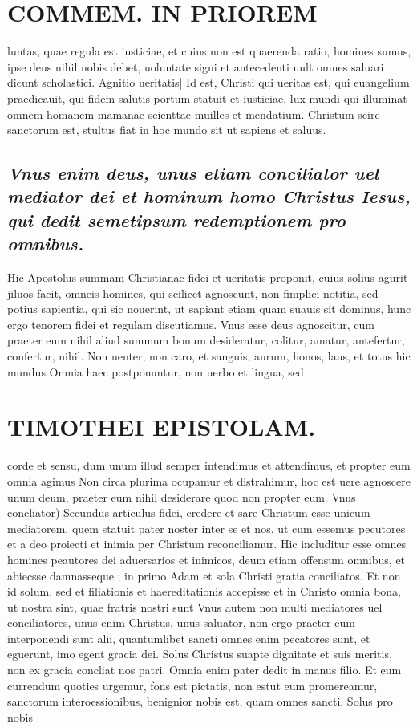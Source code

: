 \documentclass{article}
\begin{document}
\begin{pages}
\section*{COMMEM. IN PRIOREM }
\marginpar{[ p.10 ]}\pstart luntas, quae regula est iusticiae, et cuius non est quaerenda ratio, homines sumus, ipse deus nihil nobis debet, uoluntate signi et antecedenti uult omnes saluari dicunt scholastici.  \pend\pstart Agnitio ueritatis] Id est, Christi qui ueritas est, qui euangelium praedicauit, qui fidem salutis portum statuit et iusticiae, lux mundi qui illuminat omnem homanem mamanae seienttae muilles et mendatium. Christum scire sanctorum est, stultus fiat in hoc mundo sit ut sapiens et saluus.  \pend
{}
{}
\subsection*{\textit{Vnus enim deus, unus etiam conciliator uel mediator dei et hominum homo Christus Iesus, qui dedit semetipsum redemptionem pro omnibus. }}\pstart Hic Apostolus summam Christianae fidei et ueritatis proponit, cuius solius agurit jiluos facit, omneis homines, qui scilicet agnoscunt, non fimplici notitia, sed potius sapientia, qui sic nouerint, ut sapiant etiam quam suauis sit dominus, hunc ergo tenorem fidei et regulam discutiamus.  \pend\pstart Vnus esse deus agnoscitur, cum praeter eum nihil aliud summum bonum desideratur, colitur, amatur, antefertur, confertur, nihil. Non uenter, non caro, et sanguis, aurum, honos, laus, et totus hic mundus Omnia haec postponuntur, non uerbo et lingua, sed  \pend
\section*{TIMOTHEI EPISTOLAM. }
\marginpar{[ p.49 ]}\pstart corde et sensu, dum unum illud semper intendimus et attendimus, et propter eum omnia agimus Non circa plurima ocupamur et distrahimur, hoc est uere agnoscere unum deum, praeter eum nihil desiderare quod non propter eum.  \pend\pstart Vnus concliator) Secundus articulus fidei, credere et sare Christum esse unicum mediatorem, quem statuit pater noster inter se et nos, ut cum essemus pecutores et a deo proiecti et inimia per Christum reconciliamur. Hic includitur esse omnes homines peautores dei aduersarios et inimicos, deum etiam offensum omnibus, et abiecsse damnasseque ; in primo Adam et sola Christi gratia conciliatos. Et non id solum, sed et filiationis et haereditationis accepisse et in Christo omnia bona, ut nostra sint, quae fratris nostri sunt Vnus autem non multi mediatores uel conciliatores, unus enim Christus, unus saluator, non ergo praeter eum interponendi sunt alii, quantumlibet sancti omnes enim pecatores sunt, et eguerunt, imo egent gracia dei. Solus Christus suapte dignitate et suis meritis, non ex gracia concliat nos patri. Omnia enim pater dedit in manus filio. Et eum currendum quoties urgemur, fons est pictatis, non estut eum promereamur, sanctorum interoessionibus, benignior nobis est, quam omnes sancti. Solus pro nobis  \pend

\end{pages}
\end{document}
